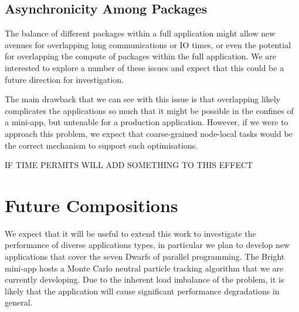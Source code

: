\documentclass[runningheads,a4paper]{llncs}
\begin{document}

\subsection{Asynchronicity Among Packages}

The balance of different packages within a full application might allow new avenues for overlapping long communications or IO times, or even the potential for overlapping the compute of packages within the full application. We are interested to explore a number of these issues and expect that this could be a future direction for investigation.

The main drawback that we can see with this issue is that overlapping likely complicates the applications so much that it might be possible in the confines of a mini-app, but untenable for a production application. However, if we were to approach this problem, we expect that coarse-grained node-local tasks would be the correct mechanism to support such optimisations.

IF TIME PERMITS WILL ADD SOMETHING TO THIS EFFECT

\section{Future Compositions}

We expect that it will be useful to extend this work to investigate the performance of diverse applications types, in particular we plan to develop new applications that cover the seven Dwarfs of parallel programming. The Bright mini-app hosts a Monte Carlo neutral particle tracking algorithm that we are currently developing. Due to the inherent load imbalance of the problem, it is likely that the application will cause significant performance degradations in general.
\end{document}
